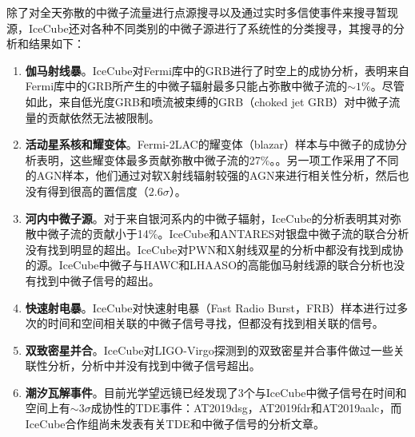 除了对全天弥散的中微子流量进行点源搜寻以及通过实时多信使事件来搜寻暂现源，IceCube还对各种不同类别的中微子源进行了系统性的分类搜寻，其搜寻的分析和结果如下：

\begin{enumerate}
    \item \textbf{伽马射线暴}。IceCube对Fermi库中的GRB进行了时空上的成协分析，表明来自Fermi库中的GRB所产生的中微子辐射最多只能占弥散中微子流的$\sim 1\%$\cite{IceCube_GRB_prompt:2014, IceCube_GRB:2022}。尽管如此，来自低光度GRB和喷流被束缚的GRB（choked jet GRB）\cite{Choked_GRB:2015}对中微子流量的贡献依然无法被限制。

    \item \textbf{活动星系核和耀变体}。Fermi-2LAC的耀变体（blazar）样本与中微子的成协分析表明，这些耀变体最多贡献弥散中微子流的27\%。\cite{IceCube_Fermi_2LAC_blazars:2016}。另一项工作采用了不同的AGN样本，他们通过对软X射线辐射较强的AGN来进行相关性分析，然后也没有得到很高的置信度（$2.6\sigma$）\cite{IceCube_AGN_core:2021}。

    \item \textbf{河内中微子源}。对于来自银河系内的中微子辐射，IceCube的分析表明其对弥散中微子流的贡献小于14\%\cite{IceCube_galactic:2017}。IceCube和ANTARES对银盘中微子流的联合分析没有找到明显的超出\cite{ANTARES_IceCube_galactic:2018}。IceCube对PWN和X射线双星的分析中都没有找到成协的源\cite{IceCube_PWN:2020, IceCube_X_binaries:2022}。IceCube中微子与HAWC\cite{IceCube_HAWC:2019}和LHAASO\cite{Huang_IceCube_LHAASO:2021, IceCube_LHAASO:2022}的高能伽马射线源的联合分析也没有找到中微子信号的超出。

    \item \textbf{快速射电暴}。IceCube对快速射电暴（Fast Radio Burst，FRB）样本进行过多次的时间和空间相关联的中微子信号寻找\cite{IceCube_FRB:2017, IceCube_FRB:2019, IceCube_FRB:2022}，但都没有找到相关联的信号。

    \item \textbf{双致密星并合}。IceCube对LIGO-Virgo探测到的双致密星并合事件做过一些关联性分析\cite{GW170817_MM, IceCube_ANTARES_Auger_GW170817, IceCube_BBH:2020}，分析中并没有找到中微子信号超出。

    \item \textbf{潮汐瓦解事件}。目前光学望远镜已经发现了3个与IceCube中微子信号在时间和空间上有$\sim 3 \sigma$成协性的TDE事件\cite{TDE_MM:2023}：AT2019dsg\cite{AT2019dsg:2020}，AT2019fdr\cite{AT2019fdr:2021}和AT2019aalc，而IceCube合作组尚未发表有关TDE和中微子信号的分析文章。

\end{enumerate}


